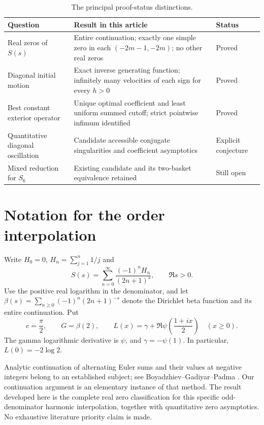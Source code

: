\documentclass[11pt,a4paper]{article}
\theoremstyle{definition}
\theoremstyle{remark}
\numberwithin{equation}{section}
\begin{document}
\begin{table}[htbp]
\centering
\small
\begin{tabularx}{\textwidth}{@{}p{}X p{}@{}}
\toprule
Question & Result in this article & Status\\
\midrule
Real zeros of $S(s)$ &
Entire continuation; exactly one simple zero in each
$(-2m-1,-2m)$; no other real zeros & Proved\\
Diagonal initial motion &
Exact inverse generating function; infinitely many velocities of each sign
for every $h>0$ & Proved\\
Best constant exterior operator &
Unique optimal coefficient and least uniform summed cutoff;
strict pointwise infimum identified & Proved\\
Quantitative diagonal oscillation &
Candidate accessible conjugate singularities and coefficient asymptotics
& Explicit conjecture\\
Mixed reduction for $S_6$ &
Existing candidate and its two-basket equivalence retained
& Still open\\
\bottomrule
\end{tabularx}
\caption{The principal proof-status distinctions.}
\label{tab:status}
\end{table}


\section{Notation for the order interpolation}
\label{sec:order-notation}

Write $H_0=0$, $H_n=\sum_{j=1}^n1/j$ and
\begin{equation}\label{sorder:def:S}
 S(s)=\sum_{n=0}^{\infty}\frac{(-1)^nH_n}{(2n+1)^s},\qquad \Re s>0.
\end{equation}
Use the positive real logarithm in the denominator, and let
$\beta(s)=\sum_{n\ge0}(-1)^n(2n+1)^{-s}$ denote the Dirichlet beta
function and its entire continuation. Put
\[
 c=\frac\pi2,\qquad G=\beta(2),\qquad
 L(x)=\gamma+\Re\psi\left(\frac{1+ix}{2}\right)\quad(x\ge0).
\]
The gamma logarithmic derivative is $\psi$, and $\gamma=-\psi(1)$.
In particular, $L(0)=-2\log2$.

Analytic continuation of alternating Euler sums and their values at
negative integers belong to an established subject; see
Boyadzhiev--Gadiyar--Padma \cite{BGP}. Our continuation argument is an
elementary instance of that method. The result developed here is the
complete real zero classification for this specific odd-denominator
harmonic interpolation, together with quantitative zero asymptotics.
No exhaustive literature priority claim is made.
\end{document}
